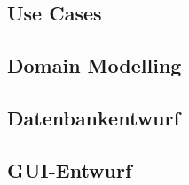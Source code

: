 \subsection{Use Cases}
  \blindtext
\subsection{Domain Modelling}
  \blindtext
\subsection{Datenbankentwurf}
  \blindtext
\subsection{GUI-Entwurf}
  \blindtext
